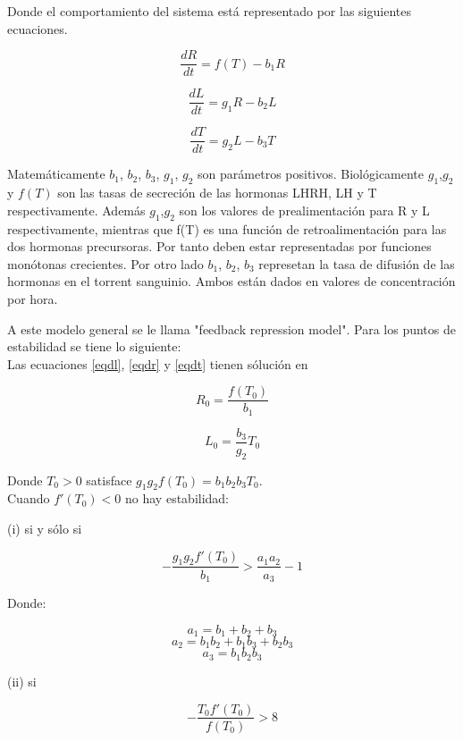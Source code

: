 \documentclass[letter,11pt]{article}
\begin{document}
Donde el comportamiento del sistema está representado por las siguientes ecuaciones.

\begin{equation}
\frac{dR}{dt} = f(T)-b_{1}R
\label{eqdr}
\end{equation}

\begin{equation}
\frac{dL}{dt} = g_{1}R-b_{2}L
\label{eqdl}
\end{equation}

\begin{equation}
 \frac{dT}{dt} = g_{2}L-b_{3}T 
 \label{eqdt}
\end{equation}


Matemáticamente $b_{1}$, $b_{2}$, $b_{3}$, $g_{1}$, $g_{2}$ son parámetros positivos. Biológicamente $g_{1}$,$g_{2}$ y $f(T)$ son las tasas de secreción de las hormonas LHRH, LH y T respectivamente. Además  $g_{1}$,$g_{2}$ son los valores de prealimentación para R y L respectivamente, mientras que f(T) es una función de retroalimentación para las dos hormonas precursoras. Por tanto deben estar representadas por funciones monótonas crecientes. Por otro lado $b_{1}$, $b_{2}$, $b_{3}$ represetan la tasa de difusión de las hormonas en el torrent sanguinio. Ambos están dados en valores de concentración por hora.

A este modelo general se le llama "feedback repression model". Para los puntos de estabilidad se tiene lo siguiente:\\

Las ecuaciones \ref{eqdl}, \ref{eqdr} y \ref{eqdt} tienen sólución en

$$R_{0} = \frac{f(T_{0})}{b_{1}}$$

$$L_{0} = \frac{b_{3}}{g_{2}}T_{0}$$

Donde $T_{0}>0$ satisface $g_{1}g_{2}f(T_{0}) = b_{1}b_{2}b_{3}T_{0}.$\\

Cuando $f'(T_{0}) < 0$ no hay estabilidad: 

(i) si y sólo si 

$$-\frac{g_{1}g_{2}f'(T_{0})}{b_{1}} > \frac{a_{1}a_{2}}{a_{3}}-1$$

Donde:

$$a_{1} = b_{1}+b_{2}+b_{3}$$
$$a_{2}=b_{1}b_{2}+b_{1}b_{3}+b_{2}b_{3}$$
$$a_{3}=b_{1}b_{2}b_{3}$$

(ii) si 

$$-\frac{T_{0}f'(T_{0})}{f(T_{0})} > 8 $$\\
\end{document}
